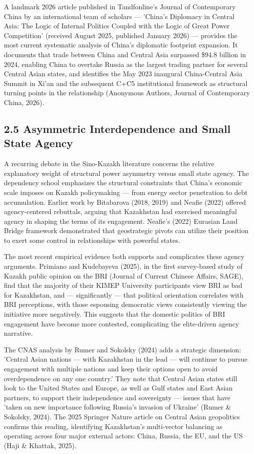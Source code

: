 \documentclass[12pt]{article}
\begin{document}
A landmark 2026 article published in Tandfonline's Journal of Contemporary China by an international team of scholars --- 'China's Diplomacy in Central Asia: The Logic of Internal Politics Coupled with the Logic of Great Power Competition' (received August 2025, published January 2026) --- provides the most current systematic analysis of China's diplomatic footprint expansion. It documents that trade between China and Central Asia surpassed \$94.8 billion in 2024, enabling China to overtake Russia as the largest trading partner for several Central Asian states, and identifies the May 2023 inaugural China-Central Asia Summit in Xi'an and the subsequent C+C5 institutional framework as structural turning points in the relationship (Anonymous Authors, Journal of Contemporary China, 2026).\par
\subsection{2.5 Asymmetric Interdependence and Small State Agency}
A recurring debate in the Sino-Kazakh literature concerns the relative explanatory weight of structural power asymmetry versus small state agency. The dependency school emphasizes the structural constraints that China's economic scale imposes on Kazakh policymaking --- from energy sector penetration to debt accumulation. Earlier work by Bitabarova (2018, 2019) and Neafie (2022) offered agency-centered rebuttals, arguing that Kazakhstan had exercised meaningful agency in shaping the terms of its engagement. Neafie's (2022) Eurasian Land Bridge framework demonstrated that geostrategic pivots can utilize their position to exert some control in relationships with powerful states.\par
The most recent empirical evidence both supports and complicates these agency arguments. Primiano and Kudebayeva (2025), in the first survey-based study of Kazakh public opinion on the BRI (Journal of Current Chinese Affairs, SAGE), find that the majority of their KIMEP University participants view BRI as bad for Kazakhstan, and --- significantly --- that political orientation correlates with BRI perceptions, with those espousing democratic views consistently viewing the initiative more negatively. This suggests that the domestic politics of BRI engagement have become more contested, complicating the elite-driven agency narrative.\par
The CNAS analysis by Rumer and Sokolsky (2024) adds a strategic dimension: 'Central Asian nations --- with Kazakhstan in the lead --- will continue to pursue engagement with multiple nations and keep their options open to avoid overdependence on any one country.' They note that Central Asian states still look to the United States and Europe, as well as Gulf states and East Asian partners, to support their independence and sovereignty --- issues that have 'taken on new importance following Russia's invasion of Ukraine' (Rumer \& Sokolsky, 2024). The 2025 Springer Nature article on Central Asian geopolitics confirms this reading, identifying Kazakhstan's multi-vector balancing as operating across four major external actors: China, Russia, the EU, and the US (Haji \& Khattak, 2025).\par
\end{document}
